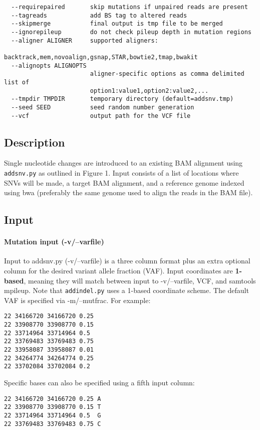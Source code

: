 \documentclass[letterpaper,11pt]{article}
\begin{document}
\begin{verbatim}
  --requirepaired       skip mutations if unpaired reads are present
  --tagreads            add BS tag to altered reads
  --skipmerge           final output is tmp file to be merged
  --ignorepileup        do not check pileup depth in mutation regions
  --aligner ALIGNER     supported aligners:
                        backtrack,mem,novoalign,gsnap,STAR,bowtie2,tmap,bwakit
  --alignopts ALIGNOPTS
                        aligner-specific options as comma delimited list of
                        option1:value1,option2:value2,...
  --tmpdir TMPDIR       temporary directory (default=addsnv.tmp)
  --seed SEED           seed random number generation
  --vcf                 output path for the VCF file

\end{verbatim}

\subsection{Description}
    Single nucleotide changes are introduced to an existing BAM alignment using \texttt {addsnv.py} as outlined in Figure 1. Input consists of a list of locations where SNVs will be made, a target BAM alignment, and a reference genome indexed using bwa (preferably the same genome used to align the reads in the BAM file). 

\subsection{Input}
\paragraph{Mutation input (-v/--varfile)}
	Input to addsnv.py (-v/--varfile) is a three column format plus an extra optional column for the desired variant allele fraction (VAF). Input coordinates are \textbf{1-based}, meaning they will match between input to -v/--varfile, VCF, and samtools mpileup. Note that \texttt{addindel.py} uses a 1-based coordinate scheme. The default VAF is specified via -m/--mutfrac. For example:
\begin{verbatim}
22 34166720 34166720 0.25
22 33908770 33908770 0.15
22 33714964 33714964 0.5
22 33769483 33769483 0.75
22 33958087 33958087 0.01
22 34264774 34264774 0.25
22 33702084 33702084 0.2
\end{verbatim}

Specific bases can also be specified using a fifth input column:
\begin{verbatim}
22 34166720 34166720 0.25 A
22 33908770 33908770 0.15 T
22 33714964 33714964 0.5  G
22 33769483 33769483 0.75 C
\end{verbatim}
\end{document}
